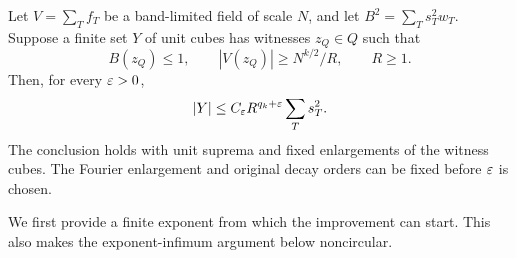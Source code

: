 \begin{theorem}\label{p:near-cauchy}
Let $V=\sum_Tf_T$ be a band-limited field of scale $N$, and let
$B^2=\sum_Ts_T^2w_T$.  Suppose a finite set $Y$ of unit cubes has witnesses
$z_Q\in Q$ such that
\[
 B(z_Q)\leq1,\qquad |V(z_Q)|\geq N^{k/2}/R,\qquad R\geq1.
\]
Then, for every $\varepsilon>0$,
\begin{equation}\label{p:near-cauchy-equation}
 |Y|\leq C_\varepsilon R^{q_k+\varepsilon}\sum_Ts_T^2.
\end{equation}
The conclusion holds with unit suprema and fixed enlargements of the witness
cubes.  The Fourier enlargement and original decay orders can be fixed
before $\varepsilon$ is chosen.
\end{theorem}

We first provide a finite exponent from which the improvement can start.
This also makes the exponent-infimum argument below noncircular.

